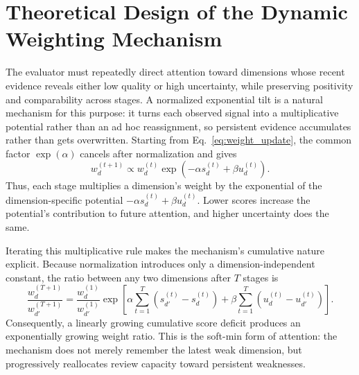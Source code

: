 \section{Theoretical Design of the Dynamic Weighting Mechanism}
\label{app:weighting_rationale}

The evaluator must repeatedly direct attention toward dimensions whose recent evidence reveals either low quality or high uncertainty, while preserving positivity and comparability across stages. A normalized exponential tilt is a natural mechanism for this purpose: it turns each observed signal into a multiplicative potential rather than an ad hoc reassignment, so persistent evidence accumulates rather than gets overwritten. Starting from Eq.~\eqref{eq:weight_update}, the common factor $\exp(\alpha)$ cancels after normalization and gives
\begin{equation}
    w_d^{(t+1)}
    \propto
    w_d^{(t)}
    \exp\!\left(-\alpha s_d^{(t)}+\beta u_d^{(t)}\right).
    \label{eq:weight_tilt_appendix}
\end{equation}
Thus, each stage multiplies a dimension's weight by the exponential of the dimension-specific potential $-\alpha s_d^{(t)}+\beta u_d^{(t)}$. Lower scores increase the potential's contribution to future attention, and higher uncertainty does the same.

Iterating this multiplicative rule makes the mechanism's cumulative nature explicit. Because normalization introduces only a dimension-independent constant, the ratio between any two dimensions after $T$ stages is
\begin{equation}
    \frac{w_d^{(T+1)}}{w_{d'}^{(T+1)}}
    =
    \frac{w_d^{(1)}}{w_{d'}^{(1)}}
    \exp\!\left[
        \alpha\sum_{t=1}^{T}\left(s_{d'}^{(t)}-s_d^{(t)}\right)
        +
        \beta\sum_{t=1}^{T}\left(u_d^{(t)}-u_{d'}^{(t)}\right)
    \right].
    \label{eq:weight_ratio_appendix}
\end{equation}
Consequently, a linearly growing cumulative score deficit produces an exponentially growing weight ratio. This is the soft-min form of attention: the mechanism does not merely remember the latest weak dimension, but progressively reallocates review capacity toward persistent weaknesses.

